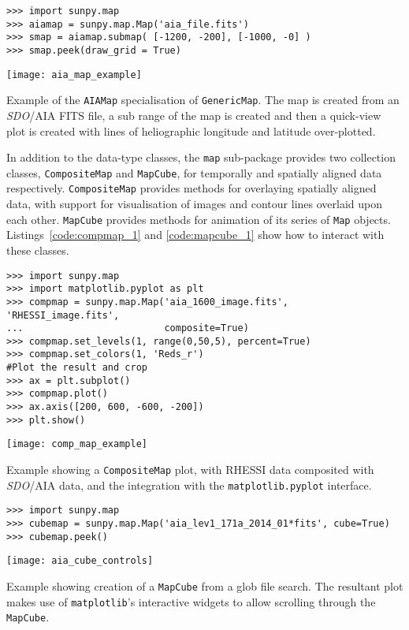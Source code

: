 \begin{listing}[H]
\begin{verbatim}
>>> import sunpy.map
>>> aiamap = sunpy.map.Map('aia_file.fits')
>>> smap = aiamap.submap( [-1200, -200], [-1000, -0] )
>>> smap.peek(draw_grid = True)
\end{verbatim}
\begin{center}
\texttt{[image: aia\_map\_example]}
\end{center}
\caption{Example of the \texttt{AIAMap} specialisation of 
\texttt{GenericMap}. The map is created from an \textit{SDO}/AIA FITS file, a sub range
of the map is created and then a quick-view plot is created with lines of heliographic longitude and latitude over-plotted.}
\label{code:aia_1}
\end{listing}

In addition to the data-type classes, the \texttt{map} sub-package provides two 
collection classes, \texttt{CompositeMap} and \texttt{MapCube}, for 
temporally and spatially aligned data respectively.
\texttt{CompositeMap} provides methods for overlaying spatially aligned 
data, with support for visualisation of images and contour lines overlaid 
upon each other.
\texttt{MapCube} provides methods for animation of its series of \texttt{Map} 
objects. Listings~\ref{code:compmap_1} and \ref{code:mapcube_1} show how to 
interact with these classes.

\begin{listing}[H]
\begin{verbatim}
>>> import sunpy.map
>>> import matplotlib.pyplot as plt
>>> compmap = sunpy.map.Map('aia_1600_image.fits', 'RHESSI_image.fits', 
...                         composite=True)
>>> compmap.set_levels(1, range(0,50,5), percent=True)
>>> compmap.set_colors(1, 'Reds_r')
#Plot the result and crop
>>> ax = plt.subplot()
>>> compmap.plot()
>>> ax.axis([200, 600, -600, -200])
>>> plt.show()
\end{verbatim}
\begin{center}
\texttt{[image: comp\_map\_example]}
\end{center}
\caption{Example showing a \texttt{CompositeMap} plot, with RHESSI data composited
with \textit{SDO}/AIA data, and the integration with the \texttt{matplotlib.pyplot} interface.}
\label{code:compmap_1}
\end{listing}

\begin{listing}[H]
\begin{verbatim}
>>> import sunpy.map
>>> cubemap = sunpy.map.Map('aia_lev1_171a_2014_01*fits', cube=True)
>>> cubemap.peek()
\end{verbatim}
\begin{center}
\texttt{[image: aia\_cube\_controls]}
\end{center}
\caption{Example showing creation of a \texttt{MapCube} from a glob file search. The 
resultant plot makes use of \texttt{matplotlib}'s interactive widgets to allow scrolling 
through the \texttt{MapCube}.}
\label{code:mapcube_1}
\end{listing}